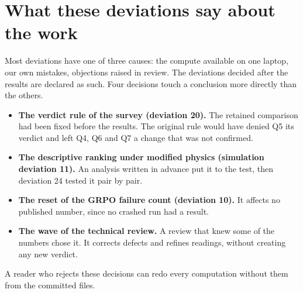 \section{What these deviations say about the work}
\label{sec:ecarts-bilan}

Most deviations have one of three causes: the compute available on one laptop, our own mistakes,
objections raised in review. The deviations decided after the results are declared as such. Four
decisions touch a conclusion more directly than the others.
\begin{itemize}
  \item \textbf{The verdict rule of the survey (deviation 20).} The retained comparison had been
        fixed before the results. The original rule would have denied Q5 its verdict and left Q4, Q6
        and Q7 a change that was not confirmed.
  \item \textbf{The descriptive ranking under modified physics (simulation deviation 11).} An
        analysis written in advance put it to the test, then deviation 24 tested it pair by pair.
  \item \textbf{The reset of the GRPO failure count (deviation 10).} It affects no published number,
        since no crashed run had a result.
  \item \textbf{The wave of the technical review.} A review that knew some of the numbers chose it. It
        corrects defects and refines readings, without creating any new verdict.
\end{itemize}
A reader who rejects these decisions can redo every computation without them from the committed
files.
